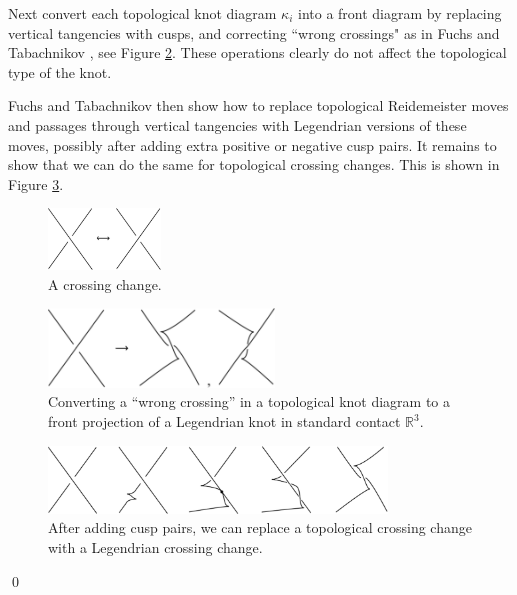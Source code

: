 Next convert each topological knot diagram $\kappa_i$ into a front diagram by replacing vertical tangencies with cusps, and correcting ``wrong crossings" as in Fuchs and Tabachnikov \cite{f&t}, see Figure \ref{wrongcrossing.fig}.  These operations clearly do not affect the topological type of the knot.

Fuchs and Tabachnikov then show how to replace topological Reidemeister moves and passages through vertical tangencies with Legendrian versions of these moves, possibly after adding extra positive or negative cusp pairs.  It remains to show that we can do the same for topological crossing changes.  This is shown in Figure \ref{legendriancrossingchange.fig}.
\begin{figure}[htbp]\label{crossingchange.fig}
\includegraphics[width=3cm]{crossingchange}
\caption{A crossing change.}
\end{figure}
\begin{figure}[htbp]\label{wrongcrossing.fig}
\includegraphics[width=6cm]{wrongcrossingtofrontdiagram}
\caption{Converting a ``wrong crossing'' in a topological knot diagram to a front projection of a Legendrian knot in standard contact $\mathbb{R}^3$.}
\end{figure}
\begin{figure}[htbp]\label{legendriancrossingchange.fig}
\includegraphics[width=9cm]{legendriancrossingchange}
\caption{After adding cusp pairs, we can replace a topological crossing change with a Legendrian crossing change.}
\end{figure}
\qed


